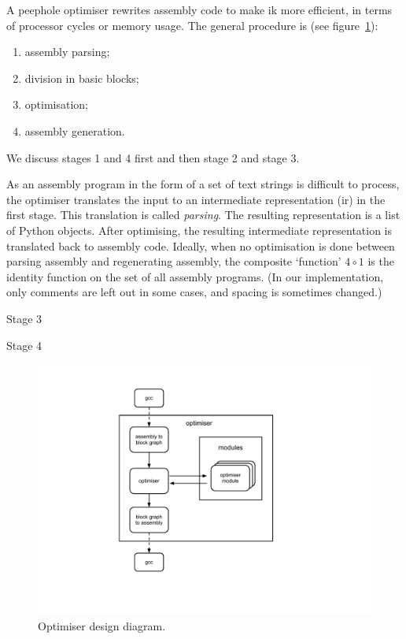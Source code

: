 A peephole optimiser rewrites assembly code to make ik more efficient, in terms of processor cycles or memory usage. The general procedure is (see figure~\ref{fig:diagram}):
\begin{enumerate}
\item assembly parsing;
\item division in basic blocks;
\item optimisation;
\item assembly generation.
\end{enumerate}
We discuss stages 1 and 4 first and then stage 2 and stage 3.

As an assembly program in the form of a set of text strings is difficult to process, the optimiser translates the input to an intermediate representation (ir) in the first stage. This translation is called \emph{parsing}. The resulting representation is a list of Python objects. After optimising, the resulting intermediate representation is translated back to assembly code. Ideally, when no optimisation is done between parsing assembly and regenerating assembly, the composite `function' $4\circ 1$ is the identity function on the set of all assembly programs. (In our implementation, only comments are left out in some cases, and spacing is sometimes changed.)

Stage 3

Stage 4



\begin{figure}[H]
\centering
\includegraphics[viewport= 170 90 510 490, clip=true]{diagram}
\caption{Optimiser design diagram.}
\label{fig:diagram}
\end{figure}

